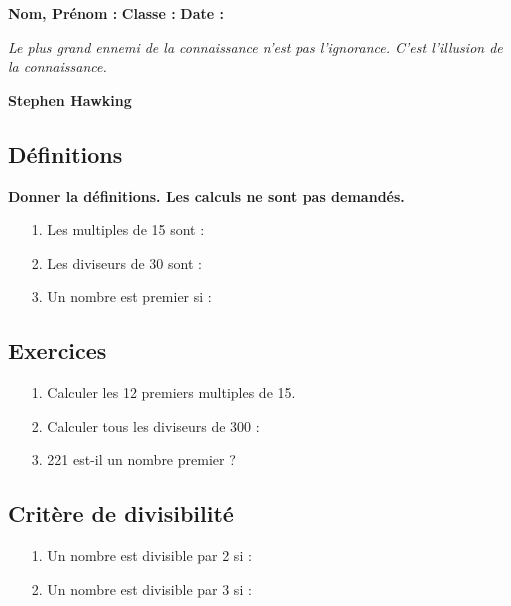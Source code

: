 



\textbf{Nom, Prénom :} \hspace{8cm} \textbf{Classe :} \hspace{3cm} \textbf{Date :}\\

\begin{center}
  \textit{Le plus grand ennemi de la connaissance n'est pas l'ignorance. C'est l'illusion de la connaissance.} 
  
  \textbf{Stephen Hawking}
\end{center}


\subsection*{Définitions}
\textbf{Donner la définitions. Les calculs ne sont pas demandés.}
  \begin{enumerate}
    \item[1.] Les multiples de 15 sont : \dotfill \\
    \Pointilles[2]
    \item[2.] Les diviseurs de 30 sont : \dotfill \\
    \Pointilles[2]
    \item[3.] Un nombre est premier si : \dotfill \\
    \Pointilles[1]
  \end{enumerate}

  \subsection*{Exercices}

    \begin{enumerate}
      \item[1.] Calculer les 12 premiers multiples de 15.\\
      \Pointilles[6]
      \item[2.] Calculer tous les diviseurs de 300 : \dotfill \\
      \Pointilles[6]
      \item[3.] 221 est-il un nombre premier ? \\
      \Pointilles[5]
    \end{enumerate}
  
\newpage

    \subsection*{Critère de divisibilité}
      \begin{enumerate}
        \item[1.] Un nombre est divisible par 2 si : \dotfill \\
        \Pointilles[2]
        \item[2.] Un nombre est divisible par 3 si :  \dotfill \\
        \Pointilles[2]
      \end{enumerate}
    
